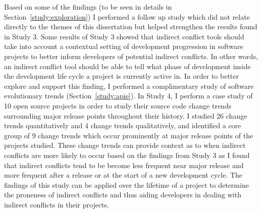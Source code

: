 Based on some of the findings (to be seen in details in Section~\ref{study:exploration}) I performed a follow up study
which did not relate directly to the themes of this dissertation but helped strengthen the results found in Study 3.
Some results of Study 3 showed that indirect conflict tools should take into account a contextual setting of development
progression in software projects to better inform developers of potential indirect conflicts. In other words, an indirect
conflict tool should be able to tell what phase of development inside the development life cycle a project is currently
active in. In order to better explore and support this finding, I performed a complimentary study of software evolutionary trends (Section~\ref{study:apie}).
In Study 4, I perform a case study of 10 open source projects in order to study their source code change trends surrounding major release points
throughout their history. I studied 26 change trends quantitatively and 4 change trends qualitatively, and identified a core group of 9 change trends which occur
prominently at major release points of the projects studied. These change trends can provide context as to when indirect conflicts are more likely
to occur based on the findings from Study 3 as I found that indirect conflicts tend to be become less frequent near major release and more
frequent after a release or at the start of a new development cycle. The findings of this study can be applied over the lifetime of a project
to determine the proneness of indirect conflicts and thus aiding developers in dealing with indirect conflicts in their projects.




